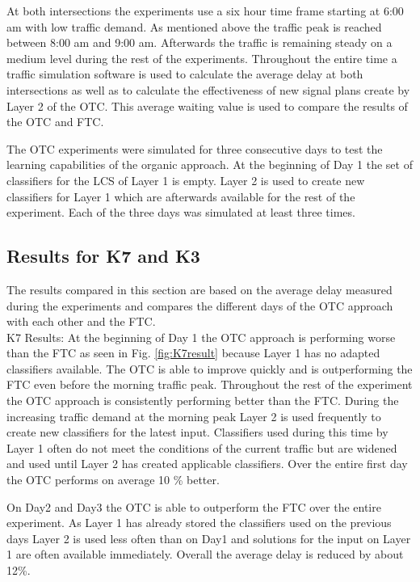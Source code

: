 At both intersections the experiments use a six hour time frame starting at 6:00 am with low traffic demand. As mentioned above the traffic peak is reached between 8:00 am and 9:00 am. Afterwards the traffic is remaining steady on a medium level during the rest of the experiments. Throughout the entire time a traffic simulation software is used to calculate the average delay at both intersections as well as to calculate the effectiveness of new signal plans create by Layer 2 of the OTC. This average waiting value is used to compare the results of the OTC and FTC.\cite{organic1}

The OTC experiments were simulated for three consecutive days to test the learning capabilities of the organic approach. At the beginning of Day 1 the set of classifiers for the LCS of Layer 1 is empty. Layer 2 is used to create new classifiers for Layer 1 which are afterwards available for the rest of the experiment. Each of the three days was simulated at least three times.\cite{organic1}


\subsection{Results for K7 and K3}
The results compared in this section are based on the average delay measured during the experiments and compares the different days of the OTC approach with each other and the FTC.\ \\

K7 Results: At the beginning of Day 1 the OTC approach is performing worse than the FTC as seen in Fig. \ref{fig:K7result} because Layer 1 has no adapted classifiers available. The OTC is able to improve quickly and is outperforming the FTC even before the morning traffic peak. Throughout the rest of the experiment the OTC approach is consistently performing better than the FTC. During the increasing traffic demand at the morning peak Layer 2 is used frequently to create new classifiers for the latest input. Classifiers used during this time by Layer 1 often do not meet the conditions of the current traffic but are widened and used until Layer 2 has created applicable classifiers. Over the entire first day the OTC performs on average 10 \% better.\cite{organic1}

On Day2 and Day3 the OTC is able to outperform the FTC over the entire experiment. As Layer 1 has already stored the classifiers used on the previous days Layer 2 is used less often than on Day1 and solutions for the input on Layer 1 are often available immediately. Overall the average delay is reduced by about 12\%.\cite{organic1}\ \\

